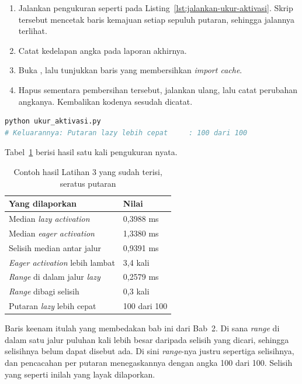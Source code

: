 \begin{enumerate}
  \item Jalankan pengukuran seperti pada Listing~\ref{lst:jalankan-ukur-aktivasi}.
    Skrip tersebut mencetak baris kemajuan setiap sepuluh putaran, sehingga
    jalannya terlihat.
  \item Catat kedelapan angka pada laporan akhirnya.
  \item Buka , lalu tunjukkan baris
    yang membersihkan \textit{import cache}.
  \item Hapus sementara pembersihan tersebut, jalankan ulang, lalu catat
    perubahan angkanya. Kembalikan kodenya sesudah dicatat.
\end{enumerate}

\begin{lstlisting}[language=bash, caption={Mengukur waktu siap kedua cara
  aktivasi, seratus putaran}, label=lst:jalankan-ukur-aktivasi]
python ukur_aktivasi.py
# Keluarannya: Putaran lazy lebih cepat     : 100 dari 100
\end{lstlisting}

Tabel~\ref{tab:lat3plugin-contoh} berisi hasil satu kali pengukuran nyata.

\begin{table}[htbp]
  \centering
  \caption{Contoh hasil Latihan 3 yang sudah terisi, seratus putaran}
  \label{tab:lat3plugin-contoh}
  \begin{tabularx}{\textwidth}{|X|l|}
    \hline
    \textbf{Yang dilaporkan} & \textbf{Nilai} \\
    \hline
    Median \textit{lazy activation} & 0,3988 ms \\
    \hline
    Median \textit{eager activation} & 1,3380 ms \\
    \hline
    Selisih median antar jalur & 0,9391 ms \\
    \hline
    \textit{Eager activation} lebih lambat & 3,4 kali \\
    \hline
    \textit{Range} di dalam jalur \textit{lazy} & 0,2579 ms \\
    \hline
    \textit{Range} dibagi selisih & 0,3 kali \\
    \hline
    Putaran \textit{lazy} lebih cepat & 100 dari 100 \\
    \hline
  \end{tabularx}
\end{table}

Baris keenam itulah yang membedakan bab ini dari Bab~2. Di sana \textit{range}
di dalam satu jalur puluhan kali lebih besar daripada selisih yang dicari,
sehingga selisihnya belum dapat disebut ada. Di sini \textit{range}-nya justru
sepertiga selisihnya, dan pencacahan per putaran menegaskannya dengan angka
100 dari 100. Selisih yang seperti inilah yang layak dilaporkan.

